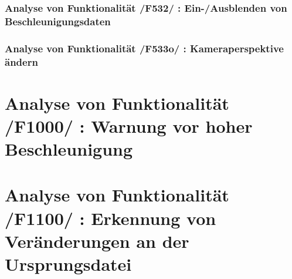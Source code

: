 \subsubsection{Analyse von Funktionalität /F532/ :  Ein-/Ausblenden von Beschleunigungsdaten}
\subsubsection{Analyse von Funktionalität /F533o/ :  Kameraperspektive ändern}
\section{Analyse von Funktionalität /F1000/ :  Warnung vor hoher Beschleunigung}
\section{Analyse von Funktionalität /F1100/ :  Erkennung von Veränderungen an der Ursprungsdatei}